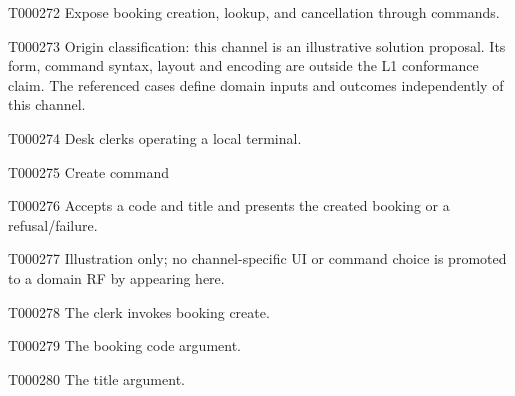 \documentclass[11pt,a4paper]{article}
\begin{document}
\begin{atlasparagraph}{T000272}
Expose booking creation, lookup, and cancellation through commands.
\end{atlasparagraph}
\begin{atlasparagraph}{T000273}
Origin classification: this channel is an illustrative solution proposal. Its form, command syntax, layout and encoding are outside the L1 conformance claim. The referenced cases define domain inputs and outcomes independently of this channel.
\end{atlasparagraph}
\begin{atlasparagraph}{T000274}
Desk clerks operating a local terminal.
\end{atlasparagraph}
\begin{atlastext}{T000275}
Create command
\end{atlastext}
\begin{atlasparagraph}{T000276}
Accepts a code and title and presents the created booking or a refusal/failure.
\end{atlasparagraph}
\begin{atlasparagraph}{T000277}
Illustration only; no channel-specific UI or command choice is promoted to a domain RF by appearing here.
\end{atlasparagraph}
\begin{atlasparagraph}{T000278}
The clerk invokes booking create.
\end{atlasparagraph}
\begin{atlasparagraph}{T000279}
The booking code argument.
\end{atlasparagraph}
\begin{atlasparagraph}{T000280}
The title argument.
\end{atlasparagraph}
\end{document}
